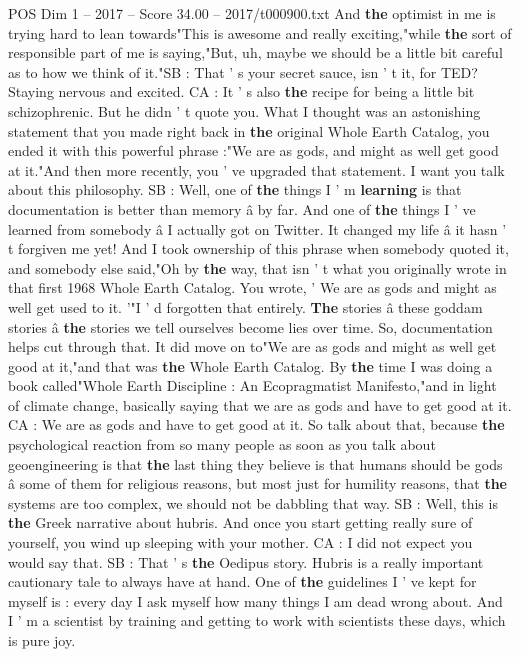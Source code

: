 \begin{textsample}{POS Dim 1 – 2017 – Score 34.00 – 2017/t000900.txt}
And \textbf{the} optimist in me is trying hard to lean towards"This is awesome and really exciting,"while \textbf{the} sort of responsible part of me is saying,"But, uh, maybe we should be a little bit careful as to how we think of it."SB : That ' s your secret sauce, isn ' t it, for TED?
Staying nervous and excited.
CA : It ' s also \textbf{the} recipe for being a little bit schizophrenic.
But he didn ' t quote you.
What I thought was an astonishing statement that you made right back in \textbf{the} original Whole Earth Catalog, you ended it with this powerful phrase :"We are as gods, and might as well get good at it."And then more recently, you ' ve upgraded that statement.
I want you talk about this philosophy.
SB : Well, one of \textbf{the} things I ' m \textbf{learning} is that documentation is better than memory â by far.
And one of \textbf{the} things I ' ve learned from somebody â I actually got on Twitter.
It changed my life â it hasn ' t forgiven me yet!
And I took ownership of this phrase when somebody quoted it, and somebody else said,"Oh by \textbf{the} way, that isn ' t what you originally wrote in that first 1968 Whole Earth Catalog.
You wrote, ' We are as gods and might as well get used to it. '"I ' d forgotten that entirely. \textbf{The} stories â these goddam stories â \textbf{the} stories we tell ourselves become lies over time.
So, documentation helps cut through that.
It did move on to"We are as gods and might as well get good at it,"and that was \textbf{the} Whole Earth Catalog.
By \textbf{the} time I was doing a book called"Whole Earth Discipline : An Ecopragmatist Manifesto,"and in light of climate change, basically saying that we are as gods and have to get good at it.
CA : We are as gods and have to get good at it.
So talk about that, because \textbf{the} psychological reaction from so many people as soon as you talk about geoengineering is that \textbf{the} last thing they believe is that humans should be gods â some of them for religious reasons, but most just for humility reasons, that \textbf{the} systems are too complex, we should not be dabbling that way.
SB : Well, this is \textbf{the} Greek narrative about hubris.
And once you start getting really sure of yourself, you wind up sleeping with your mother.
CA : I did not expect you would say that.
SB : That ' s \textbf{the} Oedipus story.
Hubris is a really important cautionary tale to always have at hand.
One of \textbf{the} guidelines I ' ve kept for myself is : every day I ask myself how many things I am dead wrong about.
And I ' m a scientist by training and getting to work with scientists these days, which is pure joy.

\end{textsample}
